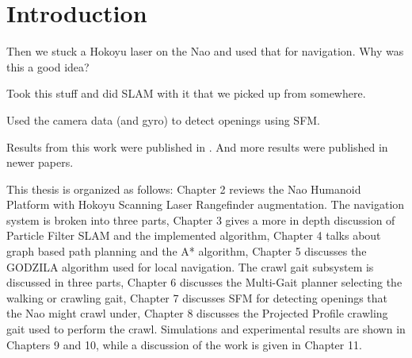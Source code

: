 \chapter{Introduction}
	\label{ch::introduction}

		Then we stuck a Hokoyu laser on the Nao and used that for navigation. Why was this a good idea?

Took this stuff and did SLAM with it that we picked up from somewhere.

Used the camera data (and gyro) to detect openings using SFM.

Results from this work were published in \cite{our_paper1}.
And more results were published in newer papers.

This thesis is organized as follows: 
% 
Chapter 2 reviews the Nao Humanoid Platform with Hokoyu Scanning Laser Rangefinder augmentation.
The navigation system is broken into three parts, 
Chapter 3 gives a more in depth discussion of Particle Filter SLAM and the implemented algorithm, 
Chapter 4 talks about graph based path planning and the A* algorithm,
Chapter 5 discusses the GODZILA algorithm used for local navigation.
The crawl gait subsystem is discussed in three parts,
Chapter 6 discusses the Multi-Gait planner selecting the walking or crawling gait,
Chapter 7 discusses SFM for detecting openings that the Nao might crawl under,
Chapter 8 discusses the Projected Profile crawling gait used to perform the crawl.
Simulations and experimental results are shown in Chapters 9 and 10, while a discussion of the work is given in Chapter 11.